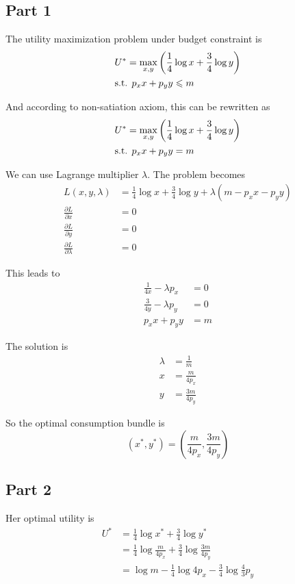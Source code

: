 \documentclass{article}
\begin{document}
\subsection{Part 1}
The utility maximization problem under budget constraint is
\begin{align*}
	&U^*=\max_{x,y}\left(\frac{1}{4}\log x+\frac{3}{4}\log y\right)\\
	&\textup{s.t. }p_xx+p_yy\leqslant m
\end{align*}

And according to non-satiation axiom, this can be rewritten as
\begin{align*}
	&U^*=\max_{x,y}\left(\frac{1}{4}\log x+\frac{3}{4}\log y\right)\\
	&\textup{s.t. }p_xx+p_yy=m
\end{align*}

We can use Lagrange multiplier $\lambda$. The problem becomes
\begin{align*}
	L(x,y,\lambda)&=\frac{1}{4}\log x+\frac{3}{4}\log y+\lambda(m-p_xx-p_yy)\\
	\frac{\partial L}{\partial x}&=0\\
	\frac{\partial L}{\partial y}&=0\\
	\frac{\partial L}{\partial\lambda}&=0
\end{align*}

This leads to
\begin{align*}
	\frac{1}{4x}-\lambda p_x&=0\\
	\frac{3}{4y}-\lambda p_y&=0\\
	p_xx+p_yy&=m
\end{align*}

The solution is
\begin{align*}
	\lambda&=\frac{1}{m}\\
	x&=\frac{m}{4p_x}\\
	y&=\frac{3m}{4p_y}
\end{align*}

So the optimal consumption bundle is
\begin{equation*}
	(x^*,y^*)=\left(\frac{m}{4p_x},\frac{3m}{4p_y}\right)
\end{equation*}

\subsection{Part 2}
Her optimal utility is
\begin{align*}
	U^*&=\frac{1}{4}\log x^*+\frac{3}{4}\log y^*\\
	&=\frac{1}{4}\log\frac{m}{4p_x}+\frac{3}{4}\log\frac{3m}{4p_y}\\
	&=\log m-\frac{1}{4}\log 4p_x-\frac{3}{4}\log\frac{4}{3}p_y
\end{align*}
\end{document}
